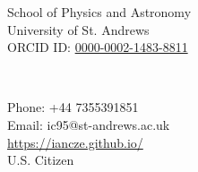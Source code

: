 \parbox[t]{3in}{
\begin{flushleft}
School of Physics and Astronomy\\
University of St. Andrews\\
ORCID ID: \href{http://orcid.org/0000-0002-1483-8811}{0000-0002-1483-8811} \\
\end{flushleft}} \ \hfill  \
\parbox[t]{3in}{
\begin{flushright}
Phone: +44 7355391851\\
Email: ic95@st-andrews.ac.uk\\
\url{https://iancze.github.io/}\\
U.S. Citizen
\end{flushright}}
